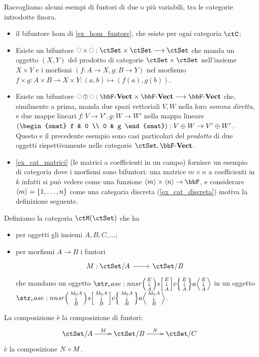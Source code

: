 \begin{examples}
	Raccogliamo alcuni esempi di funtori di due o più variabili, tra le categorie introdotte finora.
	\begin{itemize}
		\item il bifuntore hom di \ref{ex_hom_funtore}, che esiste per ogni categoria \(\ctC\);
		\item Esiste un bifuntore \(\blank\times\blank : \ctSet\times\ctSet \fun\ctSet\) che manda un oggetto \((X,Y)\) del prodotto di categorie \(\ctSet\times\ctSet\) nell'insieme \(X\times Y\) e i morfismi \((f :A \to X, g : B\to Y)\) nel morfismo \(f\times g : A\times B \to X\times Y : (a,b)\mapsto (f(a),g(b))\).
		\item Esiste un bifuntore \(\blank\oplus\blank : \ctVect\times\ctVect \fun\ctVect\) che, similmente a prima, manda due spazi vettoriali \(V,W\) nella loro \emph{somma diretta}, e due mappe lineari \(f : V\to V',g : W\to W'\) nella mappa lineare \(\left(\begin{smat} f & 0 \\ 0 & g \end{smat}\right) : V\oplus W \to V'\oplus W'\). Questo e il precedente esempio sono casi particolari del \emph{prodotto} di due oggetti rispettivamente nelle categorie \(\ctSet,\ctVect\).
		\item \ref{ex_cat_matrici} (le matrici a coefficienti in un campo) fornisce un esempio di categoria dove i morfismi sono bifuntori: una matrice \(m\times n\) a coefficienti in \(k\) infatti si può vedere come una funzione \(\bkt m\times \bkt n \to \bbF\), e considerare \(\bkt m = \{\iter n\}\) come una categoria discreta (\ref{ex_cat_discreta}) motiva la definizione seguente.
	\end{itemize}
\end{examples}
\begin{definition}
	Definiamo la categoria \(\ctM(\ctSet)\) che ha
	\begin{itemize}
		\item per oggetti gli insiemi \(A,B,C,\dots\);
		\item per morfismi \(A\to B\) i funtori
		      \[\dmFun M{\ctSet/A}{\ctSet/B}\]
		      che mandano un oggetto \(\var EA\) in un oggetto \(\var{M_0A}B\).
	\end{itemize}
	La composizione è la composizione di funtori:
	\[\xymatrix{
			\ctSet/A \ar[r]^M & \ctSet/B \ar[r]^N & \ctSet/C
		}\]
	è la composizione \(N\circ M\).
\end{definition}
